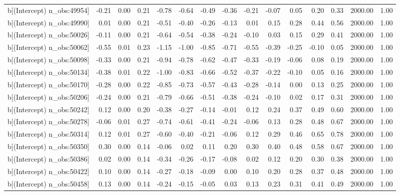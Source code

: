 \begin{table}[ht]
\begin{tabular}{rrrrrrrrrrrrrrr}
  b[(Intercept) n\_obs:49954] & -0.21 & 0.00 & 0.21 & -0.78 & -0.64 & -0.49 & -0.36 & -0.21 & -0.07 & 0.05 & 0.20 & 0.33 & 2000.00 & 1.00 \\ 
  b[(Intercept) n\_obs:49990] & 0.01 & 0.00 & 0.21 & -0.51 & -0.40 & -0.26 & -0.13 & 0.01 & 0.15 & 0.28 & 0.44 & 0.56 & 2000.00 & 1.00 \\ 
  b[(Intercept) n\_obs:50026] & -0.11 & 0.00 & 0.21 & -0.64 & -0.54 & -0.38 & -0.24 & -0.10 & 0.03 & 0.15 & 0.29 & 0.41 & 2000.00 & 1.00 \\ 
  b[(Intercept) n\_obs:50062] & -0.55 & 0.01 & 0.23 & -1.15 & -1.00 & -0.85 & -0.71 & -0.55 & -0.39 & -0.25 & -0.10 & 0.05 & 2000.00 & 1.00 \\ 
  b[(Intercept) n\_obs:50098] & -0.33 & 0.00 & 0.21 & -0.94 & -0.78 & -0.62 & -0.47 & -0.33 & -0.19 & -0.06 & 0.08 & 0.19 & 2000.00 & 1.00 \\ 
  b[(Intercept) n\_obs:50134] & -0.38 & 0.01 & 0.22 & -1.00 & -0.83 & -0.66 & -0.52 & -0.37 & -0.22 & -0.10 & 0.05 & 0.16 & 2000.00 & 1.00 \\ 
  b[(Intercept) n\_obs:50170] & -0.28 & 0.00 & 0.22 & -0.85 & -0.73 & -0.57 & -0.43 & -0.28 & -0.14 & 0.00 & 0.13 & 0.25 & 2000.00 & 1.00 \\ 
  b[(Intercept) n\_obs:50206] & -0.24 & 0.00 & 0.21 & -0.79 & -0.66 & -0.51 & -0.38 & -0.24 & -0.10 & 0.02 & 0.17 & 0.31 & 2000.00 & 1.00 \\ 
  b[(Intercept) n\_obs:50242] & 0.12 & 0.00 & 0.20 & -0.38 & -0.27 & -0.14 & -0.01 & 0.12 & 0.24 & 0.37 & 0.49 & 0.60 & 2000.00 & 1.00 \\ 
  b[(Intercept) n\_obs:50278] & -0.06 & 0.01 & 0.27 & -0.74 & -0.61 & -0.41 & -0.24 & -0.06 & 0.13 & 0.28 & 0.48 & 0.67 & 2000.00 & 1.00 \\ 
  b[(Intercept) n\_obs:50314] & 0.12 & 0.01 & 0.27 & -0.60 & -0.40 & -0.21 & -0.06 & 0.12 & 0.29 & 0.46 & 0.65 & 0.78 & 2000.00 & 1.00 \\ 
  b[(Intercept) n\_obs:50350] & 0.30 & 0.00 & 0.14 & -0.06 & 0.02 & 0.11 & 0.20 & 0.30 & 0.40 & 0.48 & 0.58 & 0.67 & 2000.00 & 1.00 \\ 
  b[(Intercept) n\_obs:50386] & 0.02 & 0.00 & 0.14 & -0.34 & -0.26 & -0.17 & -0.08 & 0.02 & 0.12 & 0.20 & 0.30 & 0.38 & 2000.00 & 1.00 \\ 
  b[(Intercept) n\_obs:50422] & 0.10 & 0.00 & 0.14 & -0.27 & -0.18 & -0.09 & 0.00 & 0.10 & 0.20 & 0.28 & 0.37 & 0.48 & 2000.00 & 1.00 \\ 
  b[(Intercept) n\_obs:50458] & 0.13 & 0.00 & 0.14 & -0.24 & -0.15 & -0.05 & 0.03 & 0.13 & 0.23 & 0.31 & 0.41 & 0.49 & 2000.00 & 1.00 \\ 

\end{tabular}
\end{table}
